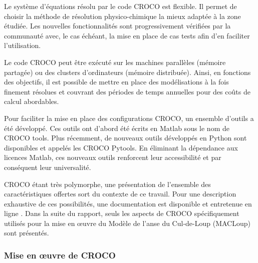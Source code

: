 \documentclass[10pt,a4paper,titlepage]{article}
\begin{document}
Le système d'équations résolu par le code CROCO est flexible.
Il permet de choisir la méthode de résolution physico-chimique la mieux adaptée à la zone étudiée.
Les nouvelles fonctionnalités sont progressivement vérifiées par la communauté avec, le cas échéant, la mise en place de cas tests afin d'en faciliter l'utilisation.


Le code CROCO peut être exécuté sur les machines parallèles (mémoire partagée) ou des clusters d'ordinateurs (mémoire distribuée).
Ainsi, en fonctions des objectifs, il est possible de mettre en place des modélisations à la fois finement résolues et couvrant des périodes de temps annuelles pour des coûts de calcul abordables.

Pour faciliter la mise en place des configurations CROCO, un ensemble d'outils a été développé.
Ces outils ont d'abord été écrits en Matlab sous le nom de CROCO tools.
Plus récemment, de nouveaux outils développés en Python sont disponibles et appelés les CROCO Pytools.
En éliminant la dépendance aux licences Matlab, ces nouveaux outils renforcent leur accessibilité et par conséquent leur universalité.

CROCO étant très polymorphe, une présentation de l'ensemble des caractéristiques offertes sort du contexte de ce travail.
Pour une description exhaustive de ces possibilités, une documentation est disponible et entretenue en ligne \parencite{documentation_croco}.
Dans la suite du rapport, seuls les aspects de CROCO spécifiquement utilisés pour la mise en \oe{}uvre du Modèle de l'anse du Cul-de-Loup (MACLoup) sont présentés.


\subsubsection{Mise en \oe{}uvre de CROCO}
\label{subsub:presentation_generale}
\end{document}
